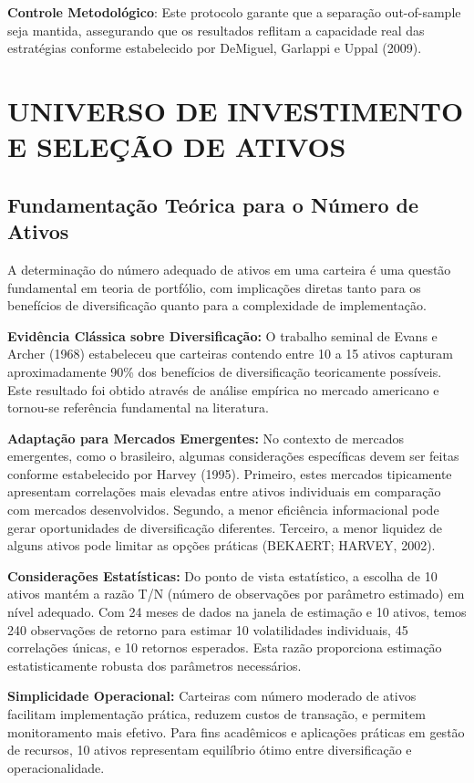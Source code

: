 \textbf{Controle Metodológico}: Este protocolo garante que a separação out-of-sample seja mantida, assegurando que os resultados reflitam a capacidade real das estratégias conforme estabelecido por DeMiguel, Garlappi e Uppal (2009).

\section{UNIVERSO DE INVESTIMENTO E SELEÇÃO DE ATIVOS}

\subsection{Fundamentação Teórica para o Número de Ativos}

A determinação do número adequado de ativos em uma carteira é uma questão fundamental em teoria de portfólio, com implicações diretas tanto para os benefícios de diversificação quanto para a complexidade de implementação.

\textbf{Evidência Clássica sobre Diversificação:} O trabalho seminal de Evans e Archer (1968) estabeleceu que carteiras contendo entre 10 a 15 ativos capturam aproximadamente 90\% dos benefícios de diversificação teoricamente possíveis. Este resultado foi obtido através de análise empírica no mercado americano e tornou-se referência fundamental na literatura.

\textbf{Adaptação para Mercados Emergentes:} No contexto de mercados emergentes, como o brasileiro, algumas considerações específicas devem ser feitas conforme estabelecido por Harvey (1995). Primeiro, estes mercados tipicamente apresentam correlações mais elevadas entre ativos individuais em comparação com mercados desenvolvidos. Segundo, a menor eficiência informacional pode gerar oportunidades de diversificação diferentes. Terceiro, a menor liquidez de alguns ativos pode limitar as opções práticas (BEKAERT; HARVEY, 2002).

\textbf{Considerações Estatísticas:} Do ponto de vista estatístico, a escolha de 10 ativos mantém a razão T/N (número de observações por parâmetro estimado) em nível adequado. Com 24 meses de dados na janela de estimação e 10 ativos, temos 240 observações de retorno para estimar 10 volatilidades individuais, 45 correlações únicas, e 10 retornos esperados. Esta razão proporciona estimação estatisticamente robusta dos parâmetros necessários.

\textbf{Simplicidade Operacional:} Carteiras com número moderado de ativos facilitam implementação prática, reduzem custos de transação, e permitem monitoramento mais efetivo. Para fins acadêmicos e aplicações práticas em gestão de recursos, 10 ativos representam equilíbrio ótimo entre diversificação e operacionalidade.

